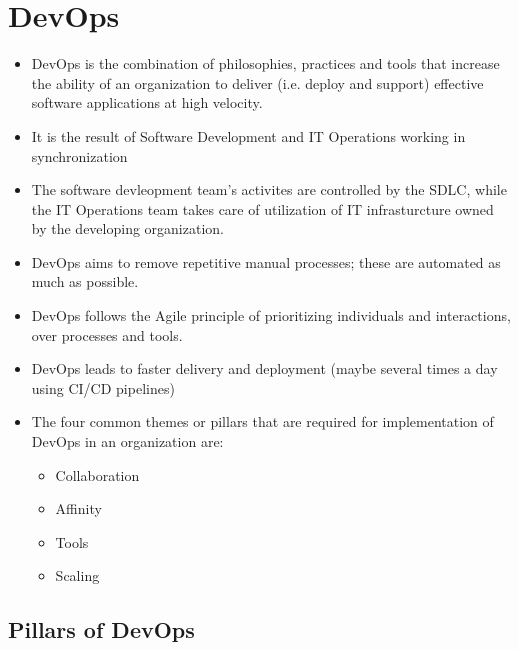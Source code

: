 \documentclass{article}
\begin{document}
\section{DevOps}
\begin{itemize}
    \item DevOps is the combination of philosophies, practices and tools that increase the ability of an organization to deliver (i.e. deploy and support) effective software applications at high velocity.
    
    \item It is the result of Software Development and IT Operations working in synchronization
    
    \item The software devleopment team's activites are controlled by the SDLC, while the IT Operations team takes care of utilization of IT infrasturcture owned by the developing organization.
    
    \item DevOps aims to remove repetitive manual processes; these are automated as much as possible. 
    
    \item DevOps follows the Agile principle of prioritizing individuals and interactions, over processes and tools. 
    
    \item DevOps leads to faster delivery and deployment (maybe several times a day using CI/CD pipelines)
    
    \item The four common themes or pillars that are required for implementation of DevOps in an organization are:
    \begin{itemize}
        \item Collaboration
        
        \item Affinity
        
        \item Tools
        
        \item Scaling
    \end{itemize}
\end{itemize}

\subsection{Pillars of DevOps}
\end{document}

